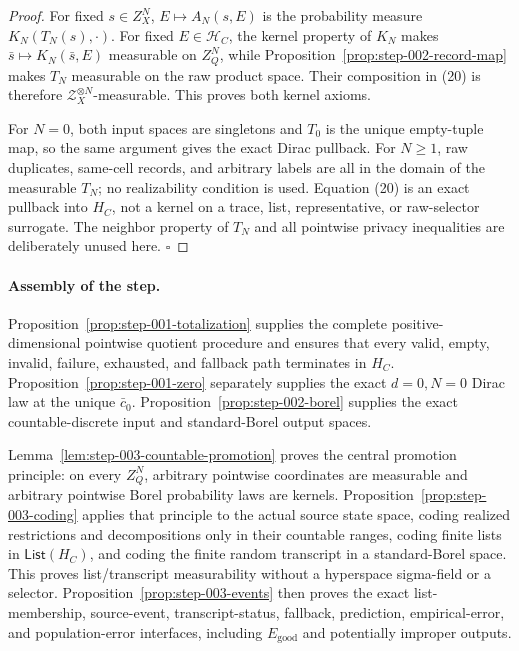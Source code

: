 \begin{proof}
For fixed \(s\in Z_X^N\), \(E\mapsto A_N(s,E)\) is the
probability measure \(K_N(T_N(s),\cdot)\). For fixed
\(E\in\mathcal H_C\), the kernel property of \(K_N\) makes
\(\bar s\mapsto K_N(\bar s,E)\) measurable on \(Z_Q^N\), while Proposition~\ref{prop:step-002-record-map} makes \(T_N\) measurable on the
raw product space. Their composition in (20) is therefore
\(\mathcal Z_X^{\otimes N}\)-measurable. This proves both kernel axioms.

For \(N=0\), both input spaces are singletons and \(T_0\) is the unique
empty-tuple map, so the same argument gives the exact Dirac pullback. For
\(N\ge1\), raw duplicates, same-cell records, and arbitrary labels are all
in the domain of the measurable \(T_N\); no realizability condition is used.
Equation (20) is an exact pullback into \(H_C\), not a kernel on a trace,
list, representative, or raw-selector surrogate. The  neighbor
property of \(T_N\) and all pointwise privacy inequalities are deliberately
unused here. \(\square\)


\end{proof}

\paragraph{Assembly of the step.}


Proposition~\ref{prop:step-001-totalization} supplies the complete
positive-dimensional pointwise quotient procedure and ensures that every
valid, empty, invalid, failure, exhausted, and fallback path terminates in
\(H_C\). Proposition~\ref{prop:step-001-zero} separately supplies
the exact \(d=0,N=0\) Dirac law at the unique \(\bar c_0\). Proposition~\ref{prop:step-002-borel} supplies the exact countable-discrete
input and standard-Borel output spaces.

Lemma~\ref{lem:step-003-countable-promotion} proves the central promotion
principle: on every \(Z_Q^N\), arbitrary pointwise coordinates are
measurable and arbitrary pointwise Borel probability laws are kernels.
Proposition~\ref{prop:step-003-coding} applies that principle to the actual
source state space, coding realized restrictions and decompositions only in
their countable ranges, coding finite lists in
\(\mathsf{List}(H_C)\), and coding the finite random transcript in a
standard-Borel space. This proves list/transcript measurability without a
hyperspace sigma-field or a selector.
Proposition~\ref{prop:step-003-events} then proves the exact list-membership,
source-event, transcript-status, fallback, prediction, empirical-error, and
population-error interfaces, including \(E_{\mathrm{good}}\) and
potentially improper outputs.

